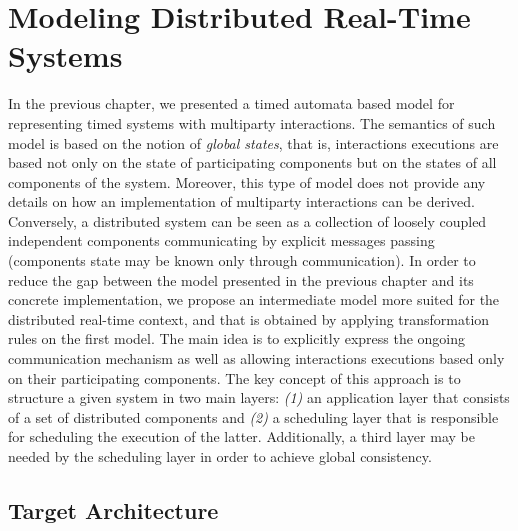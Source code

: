 \chapter{Modeling Distributed Real-Time Systems}\label{chap:3} 
\minitoc
In the previous chapter, we presented a timed automata based model for representing 
timed systems with multiparty interactions. The semantics of such model is based on 
the notion of \emph{global states}, that is, interactions executions are based not only on the 
state of participating components but on the states of all components of the system.
Moreover, this type of model does not provide any details on how an implementation of 
multiparty interactions can be derived.
Conversely, a distributed system can be seen as a collection of loosely coupled independent
components communicating by explicit messages passing (components state may be known only
through communication). 
In order to reduce the gap between the model presented in the previous chapter and its concrete
implementation, we propose an intermediate model more suited for the distributed real-time
context, and that is obtained by applying transformation rules on the first model. 
The main idea is to explicitly express the ongoing communication mechanism as well as 
allowing interactions executions based only on their participating components.
The key concept of this approach is to structure a given system in two main layers: \emph{(1)}
an application layer that consists of a set of distributed components and \emph{(2)} a 
scheduling layer that is responsible for scheduling the execution of the latter. Additionally, 
a third layer may be needed by the scheduling layer in order to achieve global consistency.
\section{Target Architecture}

